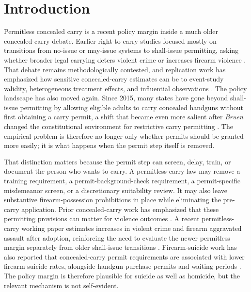 \documentclass[11pt]{article}
\begin{document}
\section*{Introduction}

Permitless concealed carry is a recent policy margin inside a much older concealed-carry debate. Earlier right-to-carry studies focused mostly on transitions from no-issue or may-issue systems to shall-issue permitting, asking whether broader legal carrying deters violent crime or increases firearm violence \citep{donohue2019,doucette2023,randScienceGunPolicy2024}. That debate remains methodologically contested, and replication work has emphasized how sensitive concealed-carry estimates can be to event-study validity, heterogeneous treatment effects, and influential observations \citep{bondy2023}. The policy landscape has also moved again. Since 2015, many states have gone beyond shall-issue permitting by allowing eligible adults to carry concealed handguns without first obtaining a carry permit, a shift that became even more salient after \textit{Bruen} changed the constitutional environment for restrictive carry permitting \citep{bruen2022}. The empirical problem is therefore no longer only whether permits should be granted more easily; it is what happens when the permit step itself is removed.

That distinction matters because the permit step can screen, delay, train, or document the person who wants to carry. A permitless-carry law may remove a training requirement, a permit-background-check requirement, a permit-specific misdemeanor screen, or a discretionary suitability review. It may also leave substantive firearm-possession prohibitions in place while eliminating the pre-carry application. Prior concealed-carry work has emphasized that these permitting provisions can matter for violence outcomes \citep{doucette2023}. A recent permitless-carry working paper estimates increases in violent crime and firearm aggravated assault after adoption, reinforcing the need to evaluate the newer permitless margin separately from older shall-issue transitions \citep{parker2025}. Firearm-suicide work has also reported that concealed-carry permit requirements are associated with lower firearm suicide rates, alongside handgun purchase permits and waiting periods \citep{siegel2026}. The policy margin is therefore plausible for suicide as well as homicide, but the relevant mechanism is not self-evident.
\end{document}

